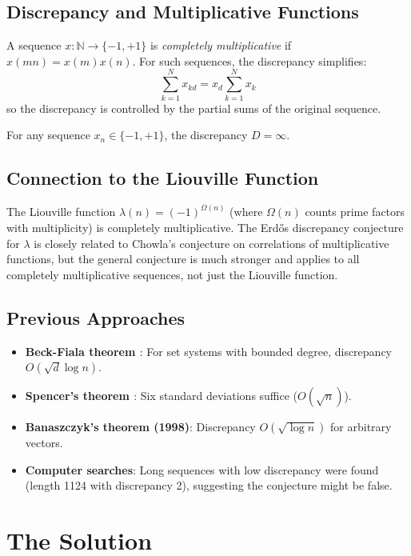 \subsection{Discrepancy and Multiplicative Functions}
A sequence $x: \mathbb{N} \to \{-1, +1\}$ is \emph{completely multiplicative} if $x(mn) = x(m)x(n)$. For such sequences, the discrepancy simplifies:
\[
\sum_{k=1}^N x_{kd} = x_d \sum_{k=1}^N x_k
\]
so the discrepancy is controlled by the partial sums of the original sequence.

\begin{conjecture}
For any sequence $x_n \in \{-1, +1\}$, the discrepancy $D = \infty$.
\end{conjecture}

\subsection{Connection to the Liouville Function}
The Liouville function $\lambda(n) = (-1)^{\Omega(n)}$ (where $\Omega(n)$ counts prime factors with multiplicity) is completely multiplicative. The Erdős discrepancy conjecture for $\lambda$ is closely related to Chowla's conjecture on correlations of multiplicative functions, but the general conjecture is much stronger and applies to all completely multiplicative sequences, not just the Liouville function.

\subsection{Previous Approaches}
\begin{itemize}
\item \textbf{Beck-Fiala theorem \cite{beckfiala1981}}: For set systems with bounded degree, discrepancy $O(\sqrt{d} \log n)$.
\item \textbf{Spencer's theorem \cite{spencer1985}}: Six standard deviations suffice ($O(\sqrt{n})$).
\item \textbf{Banaszczyk's theorem (1998)}: Discrepancy $O(\sqrt{\log n})$ for arbitrary vectors.
\item \textbf{Computer searches}: Long sequences with low discrepancy were found (length 1124 with discrepancy 2), suggesting the conjecture might be false.
\end{itemize}

\section{The Solution}

